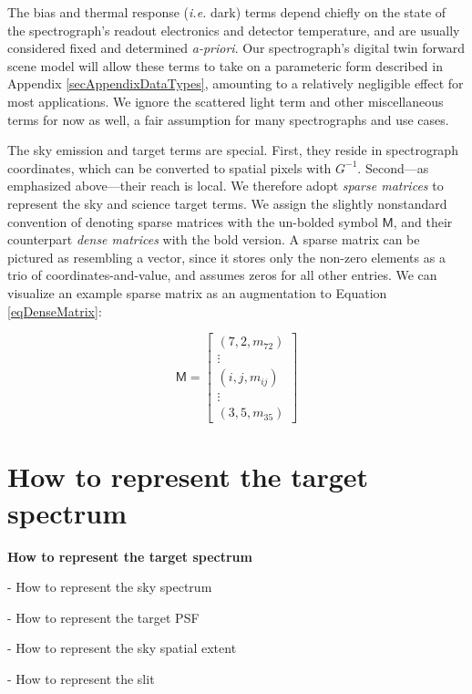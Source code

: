 \documentclass[twocolumn]{aastex631}
\begin{document}
The bias and thermal response (\emph{i.e.} dark) terms depend chiefly on the state of the spectrograph's readout electronics and detector temperature, and are usually considered fixed and determined \emph{a-priori}.  Our spectrograph's digital twin forward scene model will allow these terms to take on a parameteric form described in Appendix \ref{secAppendixDataTypes}, amounting to a relatively negligible effect for most applications.  We ignore the scattered light term and other miscellaneous terms for now as well, a fair assumption for many spectrographs and use cases.

The sky emission and target terms are special.  First, they reside in spectrograph coordinates, which can be converted to spatial pixels with $G^{-1}$.  Second---as emphasized above---their reach is local.  We therefore adopt \emph{sparse matrices} to represent the sky and science target terms. We assign the slightly nonstandard convention of denoting sparse matrices with the un-bolded symbol $\mathsf{M}$, and their counterpart \emph{dense matrices} with the bold version.  A sparse matrix can be pictured as resembling a vector, since it stores only the non-zero elements as a trio of coordinates-and-value, and assumes zeros for all other entries.  We can visualize an example sparse matrix as an augmentation to Equation \ref{eqDenseMatrix}:

\begin{equation}
  \mathsf{M} =  \begin{bmatrix}
    (7, 2, m_{72}) \\
    \vdots         \\
    (i, j, m_{ij}) \\
    \vdots         \\
    (3, 5, m_{35})    \label{eqSparseMatrix}
  \end{bmatrix}
\end{equation}


\section{How to represent the target spectrum}

\begin{mdframed}
  \textbf{How to represent the target spectrum} \par
  - How to represent the sky spectrum\par
  - How to represent the target PSF\par
  - How to represent the sky spatial extent\par
  - How to represent the slit\par
\end{mdframed}
\end{document}
